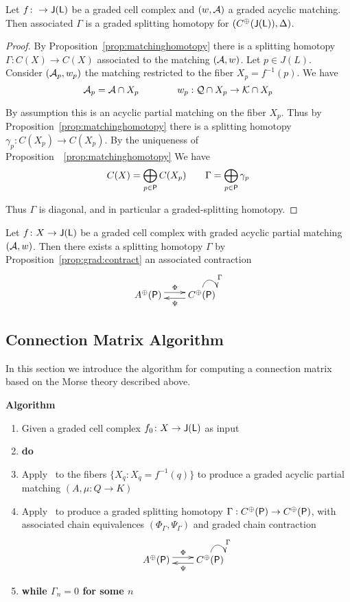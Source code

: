 \begin{prop}
Let $f\colon \to {\mathsf J}({\mathsf L})$ be a graded cell complex and $(w,{\mathcal A})$ a graded acyclic matching.  Then associated $\Gamma$ is a graded splitting homotopy for $(C^\oplus({\mathsf J}({\mathsf L})),\Delta)$.  
\end{prop}
\begin{proof}
By Proposition~\ref{prop:matchinghomotopy} there is a splitting homotopy $\Gamma:C(X)\to C(X)$ associated to the matching $({\mathcal A},w)$.  Let $p\in J(L)$.  Consider $({\mathcal A}_p,w_p)$ the matching restricted to the fiber $X_p = f^{-1}(p)$.  We have $${\mathcal A}_p = {\mathcal A}\cap X_p\quad\quad \quad \quad  w_p:{\mathcal Q}\cap X_p\to {\mathcal K}\cap X_p$$

By assumption this is an acyclic partial matching on the fiber $X_p$.  Thus by Proposition~\ref{prop:matchinghomotopy} there is a splitting homotopy $\gamma_p:C(X_p)\to C(X_p)$.    By the uniqueness of Proposition~~\ref{prop:matchinghomotopy} We have $$C(X) = \bigoplus_{p\in {\mathsf P}} C(X_p) \quad\quad \Gamma = \bigoplus_{p\in {\mathsf P}} \gamma_p$$ 

Thus $\Gamma$ is diagonal, and in particular a graded-splitting homotopy.

\end{proof}

Let $f\colon X\to {\mathsf J}({\mathsf L})$ be a  graded cell complex with graded acyclic partial matching $({\mathcal A},w)$.  Then there exists a splitting homotopy $\Gamma$ by Proposition~\ref{prop:grad:contract} an associated contraction
\[
\xymatrixrowsep{0.03in}
\xymatrixcolsep{0.3in}
\xymatrix{
A^\oplus(\sP)  \ar[r]<3pt>^{\Phi} & \ar[l]<3pt>^{\Psi} C^\oplus(\sP) \ar@(u,r)^{\Gamma}
}
\]



\subsection{Connection Matrix Algorithm}

In this section we introduce the algorithm for computing a connection matrix based on the Morse theory described above.

{\bf Algorithm}
\begin{enumerate}
\item Given a graded cell complex $f_0\colon X\to {\mathsf J}({\mathsf L})$ as input
\item {\bf do}
\item Apply~\cite[Algorithm 3.6]{focm} to the fibers $\{X_q\colon X_q = f^{-1}(q)\}$ to produce a graded acyclic partial matching $(A,\mu:Q\to K)$
\item Apply~\cite[Algorithm 3.12]{focm} to produce a graded splitting homotopy $\Gamma:C^\oplus({\mathsf P})\to C^\oplus({\mathsf P})$, with associated chain equivalences $(\Phi_\Gamma,\Psi_\Gamma)$ and graded chain contraction
\[
\xymatrixrowsep{0.03in}
\xymatrixcolsep{0.3in}
\xymatrix{
A^\oplus(\sP)  \ar[r]<3pt>^{\Phi} & \ar[l]<3pt>^{\Psi} C^\oplus(\sP) \ar@(u,r)^{\Gamma}
}
\]
\item {\bf while $\Gamma_n = 0$ for some $n$}
\end{enumerate}


